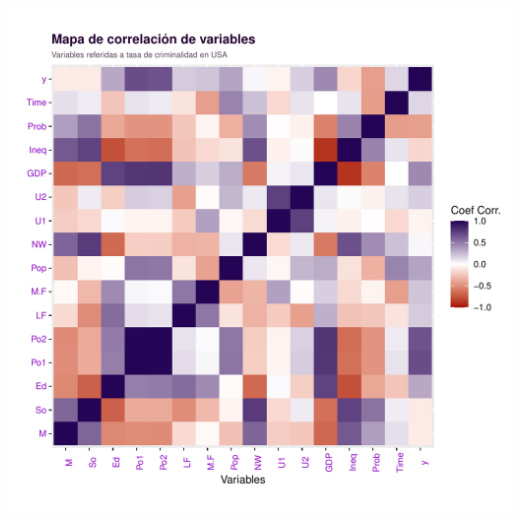 \documentclass[11pt,a4paper]{article}\usepackage[]{graphicx}\usepackage[]{color}
\makeatletter
\def\maxwidth{ %
  \ifdim\Gin@nat@width>\linewidth
    \linewidth
  \else
    \Gin@nat@width
  \fi
}
\newenvironment{knitrout}{}{} %
\makeatother
\begin{document}
\begin{knitrout}
\color{fgcolor}
\includegraphics[width=\maxwidth]{figure/unnamed-chunk-3-1} 

\end{knitrout}
\end{document}
